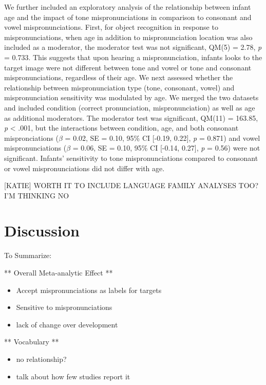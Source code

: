 \documentclass[man]{apa6}
\providecommand{\tightlist}{%
  \setlength{\itemsep}{0pt}\setlength{\parskip}{0pt}}
\theoremstyle{definition}
\theoremstyle{definition}
\theoremstyle{definition}
\theoremstyle{remark}
\begin{document}
We further included an exploratory analysis of the relationship between
infant age and the impact of tone mispronunciations in comparison to
consonant and vowel mispronunciations. First, for object recognition in
response to mispronunciations, when age in addition to mispronunciation
location was also included as a moderator, the moderator test was not
significant, QM(5) = 2.78, \emph{p} = 0.733. This suggests that upon
hearing a mispronunciation, infants looks to the target image were not
different between tone and vowel or tone and consonant
mispronunciations, regardless of their age. We next assessed whether the
relationship between mispronunciation type (tone, consonant, vowel) and
mispronunciation sensitivity was modulated by age. We merged the two
datasets and included condition (correct pronunciation,
mispronunciation) as well as age as additional moderators. The moderator
test was significant, QM(11) = 163.85, \emph{p} \textless{} .001, but
the interactions between condition, age, and both consonant
mispronciations (\(\beta\) = 0.02, SE = 0.10, 95\% CI {[}-0.19, 0.22{]},
\emph{p} = 0.871) and vowel mispronunciations (\(\beta\) = 0.06, SE =
0.10, 95\% CI {[}-0.14, 0.27{]}, \emph{p} = 0.56) were not significant.
Infants' sensitivity to tone mispronunciations compared to consonant or
vowel mispronunciations did not differ with age.

{[}KATIE{]} WORTH IT TO INCLUDE LANGUAGE FAMILY ANALYSES TOO? I'M
THINKING NO

\section{Discussion}\label{discussion}

To Summarize:

** Overall Meta-analytic Effect **

\begin{itemize}
\tightlist
\item
  Accept mispronunciations as labels for targets
\item
  Sensitive to mispronunciations
\item
  lack of change over development
\end{itemize}

** Vocabulary **

\begin{itemize}
\tightlist
\item
  no relationship?
\item
  talk about how few studies report it
\end{itemize}
\end{document}
